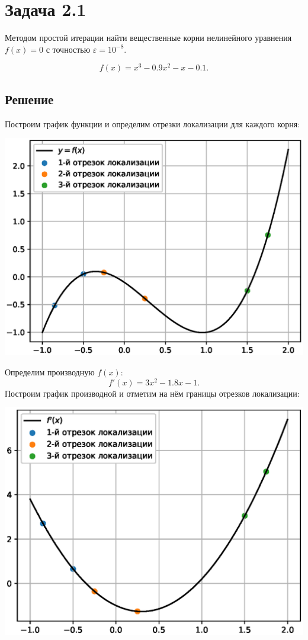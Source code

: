 \section*{Задача 2.1}
Методом простой итерации найти вещественные корни нелинейного уравнения $f(x)=0$ с точностью $\varepsilon = 10^{-8}$.

\[ f(x) = x^3 - 0.9x^2 - x - 0.1. \]

\subsection*{Решение}
Построим график функции и определим отрезки локализации для каждого корня:

\includegraphics[width=\textwidth]{211.eps}

Определим производную $f(x)$:
\[ f'(x) = 3x^2 - 1.8 x - 1. \]
Построим график производной и отметим на нём границы отрезков локализации:

\includegraphics[width=\textwidth]{212.eps}

